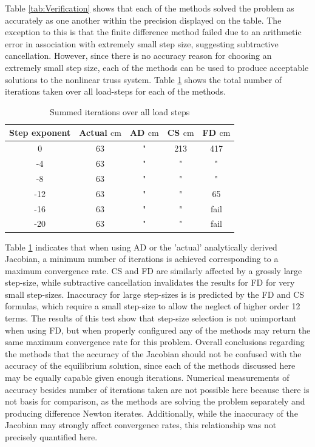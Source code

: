 \documentclass[preprint,12pt]{elsarticle}
\begin{document}
Table \ref{tab:Verification} shows that each of the methods solved the problem
as accurately as one another within the precision displayed on the table. The
exception to this is that the finite difference method failed due to an
arithmetic error in association with extremely small step size, suggesting
subtractive cancellation. However, since there is no accuracy reason for
choosing an extremely small step size, each of the methods can be used to
produce acceptable solutions to the nonlinear truss system. Table
\ref{tab:ConvergenceStudy} shows the total number of iterations taken over all
load-steps for each of the methods. 

\begin{table}[!ht]    
  \centering
        \caption{Summed iterations over all load steps} \label{tab:ConvergenceStudy}   
        \begin{tabular}{c c c c c}
         \toprule
         Step exponent & Actual $\si{\centi\meter}$ & AD $\si{\centi\meter}$ & CS $\si{\centi\meter}$ & FD $\si{\centi\meter}$\\ 
        \midrule
        0 & 63 & " & 213 & 417\\
        -4 & 63 & " & " & "\\
        -8 & 63& " & " & "\\
        -12 &63& " & " &  65\\
        -16 &63& " & " & fail\\
        -20 &63& " & " & fail\\
        \bottomrule
    \end{tabular}
\end{table}

Table \ref{tab:ConvergenceStudy} indicates that when using AD or the 'actual'
analytically derived Jacobian, a minimum number of iterations is achieved
corresponding to a maximum convergence rate. CS and FD are similarly affected
by a grossly large step-size, while subtractive cancellation invalidates the
results for FD for very small step-sizes. Inaccuracy for large step-sizes is is
predicted by the FD and CS formulas, which require a small
step-size to allow the neglect of higher order 12 terms. The results of this
test show that step-size selection is not unimportant when using FD, but when
properly configured any of the methods may return the same maximum convergence
rate for this problem.  Overall conclusions regarding the methods that the accuracy of the
Jacobian should not be confused with the accuracy of the equilibrium
solution, since each of the methods discussed here may be equally capable given
enough iterations. Numerical measurements of accuracy besides number of iterations taken
are not possible here because there is not basis for comparison, as the methods are solving
the problem separately and producing difference Newton iterates. Additionally, while the inaccuracy of the Jacobian may
strongly affect convergence rates, this relationship was not precisely quantified here.
\end{document}
